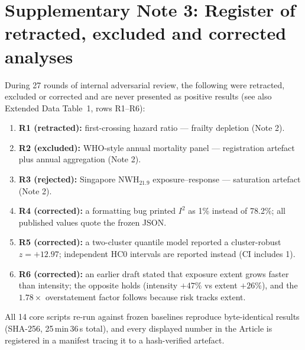 \documentclass[12pt,a4paper]{article}
\begin{document}
\section*{Supplementary Note 3: Register of retracted, excluded and corrected analyses}
During 27 rounds of internal adversarial review, the following were retracted, excluded or
corrected and are never presented as positive results (see also Extended Data Table~1, rows
R1--R6):
\begin{enumerate}
\item \textbf{R1 (retracted):} first-crossing hazard ratio --- frailty depletion (Note 2).
\item \textbf{R2 (excluded):} WHO-style annual mortality panel --- registration artefact plus
annual aggregation (Note 2).
\item \textbf{R3 (rejected):} Singapore $\mathrm{NWH}_{21.9}$ exposure--response --- saturation
artefact (Note 2).
\item \textbf{R4 (corrected):} a formatting bug printed $I^2$ as 1\% instead of 78.2\%; all
published values quote the frozen JSON.
\item \textbf{R5 (corrected):} a two-cluster quantile model reported a cluster-robust
$z=+12.97$; independent HC0 intervals are reported instead (CI includes 1).
\item \textbf{R6 (corrected):} an earlier draft stated that exposure extent grows faster than
intensity; the opposite holds (intensity $+47\%$ vs extent $+26\%$), and the $1.78\times$
overstatement factor follows because risk tracks extent.
\end{enumerate}
All 14 core scripts re-run against frozen baselines reproduce byte-identical results (SHA-256,
25\,min\,36\,s total), and every displayed number in the Article is registered in a manifest
tracing it to a hash-verified artefact.
\end{document}
